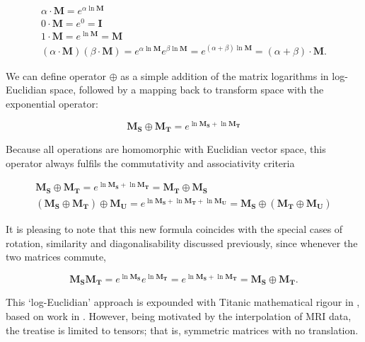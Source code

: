         \begin{gather}
          \alpha \cdot \mathbf{M} = e^{\alpha\ln\mathbf{M}} \\
          0 \cdot \mathbf{M} = e^0 = \mathbf{I} \\
          1 \cdot \mathbf{M} = e^{\ln\mathbf{M}} = \mathbf{M} \\
          (\alpha \cdot \mathbf{M})(\beta \cdot \mathbf{M}) = e^{\alpha\ln\mathbf{M}}e^{\beta\ln\mathbf{M}}
                                                            = e^{(\alpha + \beta)\ln\mathbf{M}}
                                                            = (\alpha + \beta) \cdot \mathbf{M}.
        \end{gather}
        
        We can define operator $\oplus$ as a simple addition of the matrix logarithms in log-Euclidian space, followed by a mapping back to transform space with the exponential operator:
        
        \begin{equation}
          \mathbf{M_S} \oplus \mathbf{M_T} = e^{\ln\mathbf{M_S} + \ln\mathbf{M_T}}
        \end{equation}
        
        Because all operations are homomorphic with Euclidian vector space, this operator always fulfils the commutativity and associativity criteria
        
        \begin{gather}
          \mathbf{M_S} \oplus \mathbf{M_T} = e^{\ln\mathbf{M_S} + \ln\mathbf{M_T}} = \mathbf{M_T} \oplus \mathbf{M_S} \\
          (\mathbf{M_S}\oplus\mathbf{M_T})\oplus\mathbf{M_U} = e^{\ln\mathbf{M_S} + \ln\mathbf{M_T} + \ln\mathbf{M_U}} = \mathbf{M_S}\oplus(\mathbf{M_T}\oplus\mathbf{M_U})
        \end{gather}
        
        It is pleasing to note that this new formula coincides with the special cases of rotation, similarity and diagonalisability discussed previously, since whenever the two matrices commute,
        
        \begin{equation}
          \mathbf{M_SM_T} = e^{\ln\mathbf{M_S}}e^{\ln\mathbf{M_T}} = e^{\ln\mathbf{M_S} + \ln\mathbf{M_T}} = \mathbf{M_S} \oplus \mathbf{M_T}.
        \end{equation}
        
        This `log-Euclidian' approach is expounded with Titanic mathematical rigour in \cite{Arsigny2005,Arsigny2005a,Pennec2006}, based on work in \cite{Pennec2006a}. However, being motivated by the interpolation of MRI data, the treatise is limited to tensors; that is, symmetric matrices with no translation.
        
